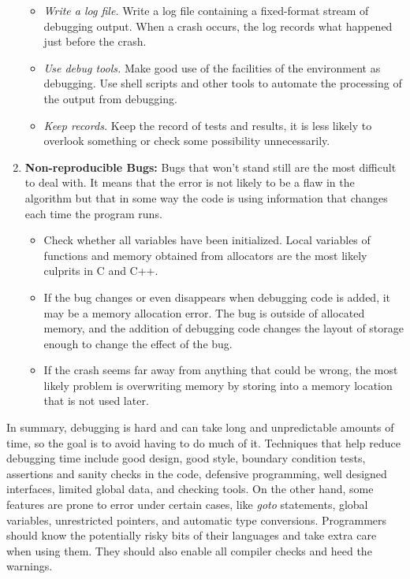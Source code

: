 \documentclass[draftclsnofoot,journal,onecolumn,12pt]{IEEEtran}
\begin{document}
\begin{enumerate}
\begin{itemize}
    \item \textit{Write a log file.} Write a log file containing a fixed-format stream of debugging output. When a crash occurs, the log records what happened just before the crash.
    \item \textit{Use debug tools.} Make good use of the facilities of the environment as debugging. Use shell scripts and other tools to automate the processing of the output from debugging.
    \item \textit{Keep records.} Keep the record of tests and results, it is less likely to overlook something or check some possibility unnecessarily.
    \end{itemize}
  \item \textbf{Non-reproducible Bugs:} Bugs that won't stand still are the most difficult to deal with. It means that the error is not likely to be a flaw in the algorithm but that in some way the code is using information that changes each time the program runs.
      \begin{itemize}
        \item Check whether all variables have been initialized. Local variables of functions and memory obtained from allocators are the most likely culprits in C and C++.
        \item If the bug changes or even disappears when debugging code is added, it may be a memory allocation error. The bug is outside of allocated memory, and the addition of debugging code changes the layout of storage enough to change the effect of the bug.
        \item If the crash seems far away from anything that could be wrong, the most likely problem is overwriting memory by storing into a memory location that is not used later.
      \end{itemize}
\end{enumerate}

In summary, debugging is hard and can take long and unpredictable amounts of time, so the goal is to avoid having to do much of it. Techniques that help reduce debugging time include good design, good style, boundary condition tests, assertions and sanity checks in the code, defensive programming, well designed interfaces, limited global data, and checking tools. On the other hand, some features are prone to error under certain cases, like \textit{goto} statements, global variables, unrestricted pointers, and automatic type conversions. Programmers should know the potentially risky bits of their languages and take extra care when using them. They should also enable all compiler checks and heed the warnings.
\end{document}

